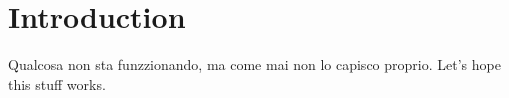 \documentclass{article}
\begin{document}
    \section{Introduction}
    Qualcosa non sta funzzionando, ma come mai non lo capisco proprio. Let's hope this stuff works.
\end{document}
